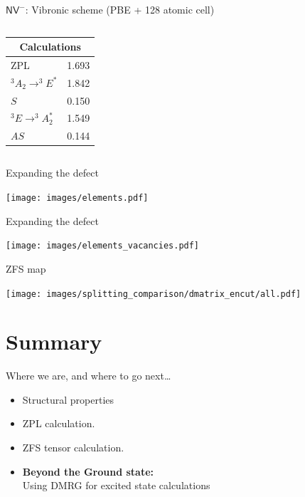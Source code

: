 \documentclass[]{beamer}
\begin{document}
\begin{frame}{ $ \mathsf{NV}^{-} $: Vibronic scheme (PBE + 128 atomic cell)}
{\begin{columns}
\begin{column}{0.3333\textwidth}
        \begin{center}
          \small
          \begin{tabular}{lc}
            \hline
            \multicolumn{2}{c}{Calculations}\\
            \hline
            ZPL & 1.693\\
            \hline
            $ ^3A_2 \to ^3E^{*} $  & 1.842\\
            \hline
            $ S $  & 0.150\\
            \hline
            $  ^3E \to ^3A_2^{*} $  & 1.549\\
            \hline
            $ AS $  & 0.144\\
            \hline
          \end{tabular}
        \end{center}
      \end{column}
    \end{columns}
    }
  \end{frame}

\begin{frame}{Expanding the defect}
  \begin{center}
    \texttt{[image: images/elements.pdf]}
  \end{center}
\end{frame}

\begin{frame}{Expanding the defect}
  \begin{center}
    \texttt{[image: images/elements\_vacancies.pdf]}
  \end{center}
\end{frame}

\begin{frame}{ZFS map}
  \begin{center}
    \texttt{[image: images/splitting\_comparison/dmatrix\_encut/all.pdf]}
  \end{center}
\end{frame}





\section{Summary} %




\begin{frame}{Where we are, and where to go next\ldots}
  \begin{itemize}
    \item Structural properties
    \item ZPL calculation.
    \item ZFS tensor calculation.
    \item \textbf{Beyond the Ground state:}\\
      Using DMRG for excited state calculations
  \end{itemize}
\end{frame}




\end{document}
